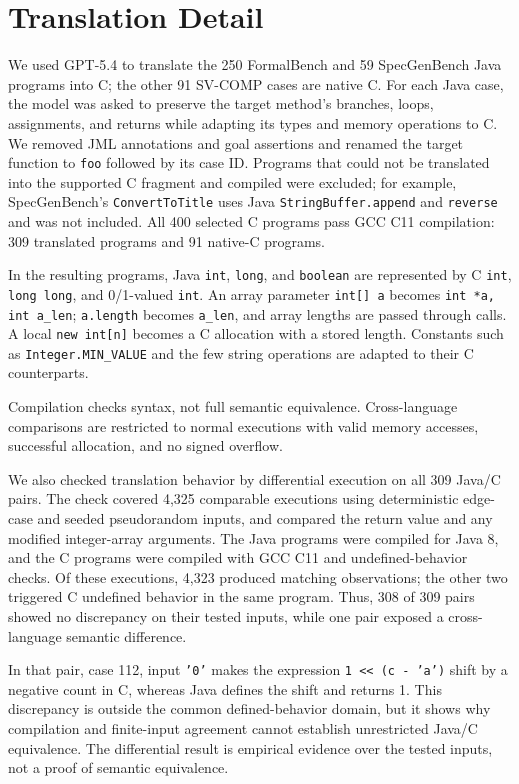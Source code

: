 \section{{Translation Detail}}
\label{app:benchmark-translation}

{We used GPT-5.4 to translate the 250 FormalBench and 59 SpecGenBench Java programs into C; the other 91 SV-COMP cases are native C. For each Java case, the model was asked to preserve the target method's branches, loops, assignments, and returns while adapting its types and memory operations to C. We removed JML annotations and goal assertions and renamed the target function to \texttt{foo} followed by its case ID. Programs that could not be translated into the supported C fragment and compiled were excluded; for example, SpecGenBench's \texttt{ConvertToTitle} uses Java \texttt{StringBuffer.append} and \texttt{reverse} and was not included. All 400 selected C programs pass GCC C11 compilation: 309 translated programs and 91 native-C programs.}

{In the resulting programs, Java \texttt{int}, \texttt{long}, and \texttt{boolean} are represented by C \texttt{int}, \texttt{long long}, and 0/1-valued \texttt{int}. An array parameter \texttt{int[] a} becomes \texttt{int *a, int a\_len}; \texttt{a.length} becomes \texttt{a\_len}, and array lengths are passed through calls. A local \texttt{new int[n]} becomes a C allocation with a stored length. Constants such as \texttt{Integer.MIN\_VALUE} and the few string operations are adapted to their C counterparts.}

{Compilation checks syntax, not full semantic equivalence. Cross-language comparisons are restricted to normal executions with valid memory accesses, successful allocation, and no signed overflow.}

{We also checked translation behavior by differential execution on all 309 Java/C pairs. The check covered 4,325 comparable executions using deterministic edge-case and seeded pseudorandom inputs, and compared the return value and any modified integer-array arguments. The Java programs were compiled for Java 8, and the C programs were compiled with GCC C11 and undefined-behavior checks. Of these executions, 4,323 produced matching observations; the other two triggered C undefined behavior in the same program. Thus, 308 of 309 pairs showed no discrepancy on their tested inputs, while one pair exposed a cross-language semantic difference.}

{In that pair, case 112, input \texttt{'0'} makes the expression \texttt{1 << (c - 'a')} shift by a negative count in C, whereas Java defines the shift and returns 1. This discrepancy is outside the common defined-behavior domain, but it shows why compilation and finite-input agreement cannot establish unrestricted Java/C equivalence. The differential result is empirical evidence over the tested inputs, not a proof of semantic equivalence.}
